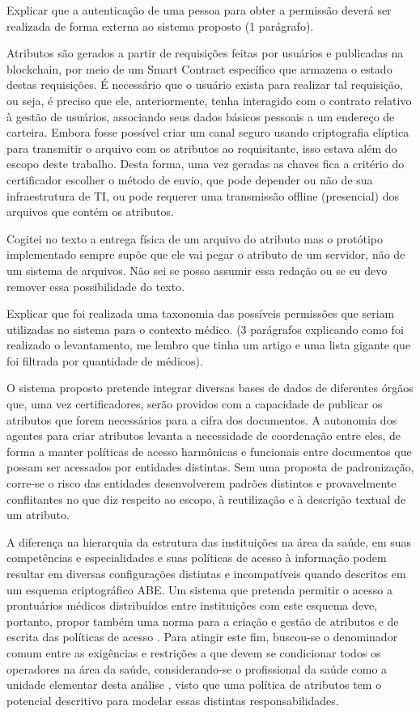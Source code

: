 \documentclass[a4paper,11pt]{article}
\begin{document}
{\color{ForestGreen}Explicar que a autenticação de uma pessoa para obter a permissão deverá ser realizada de forma externa ao sistema proposto (1 parágrafo).}

Atributos são gerados a partir de requisições feitas por usuários e publicadas na blockchain, por meio de um Smart Contract específico que armazena o estado destas requisições. É necessário que o usuário exista para realizar tal requisição, ou seja, é preciso que ele, anteriormente, tenha interagido com o contrato relativo à gestão de usuários, associando seus dados básicos pessoais a um endereço de carteira. Embora fosse possível criar um canal seguro usando criptografia elíptica para transmitir o arquivo com os atributos ao requisitante, isso estava além do escopo deste trabalho. Desta forma, uma vez geradas as chaves fica a critério do certificador escolher o método de envio, que pode depender ou não de sua infraestrutura de TI, ou pode requerer uma transmissão offline (presencial) dos arquivos que contém os atributos.

{\color{RoyalBlue} Cogitei no texto a entrega física de um arquivo do atributo mas o protótipo implementado sempre supõe que ele vai pegar o atributo de um servidor, não de um sistema de arquivos. Não sei se posso assumir essa redação ou se eu devo remover essa possibilidade do texto.}

{\color{ForestGreen}Explicar que foi realizada uma taxonomia das possíveis permissões que seriam utilizadas no sistema para o contexto médico. (3 parágrafos explicando como foi realizado o levantamento, me lembro que tinha um artigo e uma lista gigante que foi filtrada por quantidade de médicos).}

O sistema proposto pretende integrar diversas bases de dados de diferentes órgãos que, uma vez  certificadores, serão providos com a capacidade de publicar os atributos que forem necessários para a cifra dos documentos. A autonomia dos agentes para criar atributos levanta a necessidade de coordenação entre eles, de forma a manter políticas de acesso harmônicas e funcionais entre documentos que possam ser acessados por entidades distintas. Sem uma proposta de padronização, corre-se o risco das entidades desenvolverem padrões distintos e provavelmente conflitantes no que diz respeito ao escopo, à reutilização e à descrição textual de um atributo.

A diferença na hierarquia da estrutura das instituições na área da saúde, em suas competências e especialidades e suas políticas de acesso à informação podem resultar em diversas configurações distintas e incompatíveis quando descritos em um esquema criptográfico ABE. Um sistema que pretenda permitir o acesso a prontuários médicos distribuídos entre instituições com este esquema deve, portanto, propor também uma norma para a criação e gestão de atributos e de escrita das políticas de acesso . Para atingir este fim, buscou-se o denominador comum entre as exigências e restrições a que devem se condicionar todos os operadores na área da saúde, considerando-se o profissional da saúde como a unidade elementar desta análise , visto que uma política de atributos tem o potencial descritivo para modelar essas distintas responsabilidades.
\end{document}
